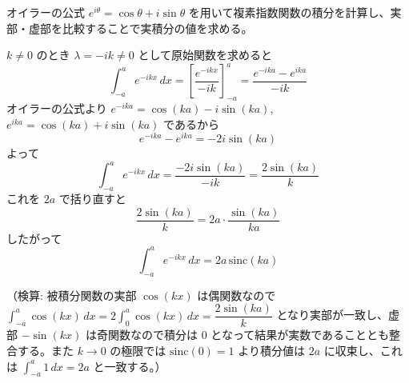 
オイラーの公式 $e^{i\theta} = \cos\theta + i\sin\theta$ を用いて複素指数関数の積分を計算し、実部・虚部を比較することで実積分の値を求める。

$k \neq 0$ のとき $\lambda = -ik \neq 0$ として原始関数を求めると
\[
\int_{-a}^{a} e^{-ikx}\,dx
= \left[\frac{e^{-ikx}}{-ik}\right]_{-a}^{a}
= \frac{e^{-ika} - e^{ika}}{-ik}
\]
オイラーの公式より $e^{-ika} = \cos(ka) - i\sin(ka)$, $e^{ika} = \cos(ka) + i\sin(ka)$ であるから
\[
e^{-ika} - e^{ika} = -2i\sin(ka)
\]
よって
\[
\int_{-a}^{a} e^{-ikx}\,dx = \frac{-2i\sin(ka)}{-ik} = \frac{2\sin(ka)}{k}
\]
これを $2a$ で括り直すと
\[
\frac{2\sin(ka)}{k} = 2a\cdot\frac{\sin(ka)}{ka}
\]
したがって
\[
\boxed{\; \int_{-a}^{a} e^{-ikx}\,dx = 2a\,\mathrm{sinc}(ka) \;}
\]

（検算: 被積分関数の実部 $\cos(kx)$ は偶関数なので $\displaystyle\int_{-a}^{a}\cos(kx)\,dx = 2\int_{0}^{a}\cos(kx)\,dx = \dfrac{2\sin(ka)}{k}$ となり実部が一致し、虚部 $-\sin(kx)$ は奇関数なので積分は $0$ となって結果が実数であることとも整合する。また $k \to 0$ の極限では $\mathrm{sinc}(0)=1$ より積分値は $2a$ に収束し、これは $\displaystyle\int_{-a}^{a}1\,dx = 2a$ と一致する。）
